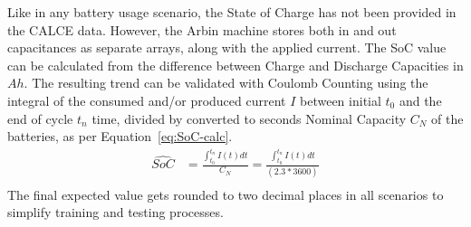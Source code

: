 %
Like in any battery usage scenario, the State of Charge has not been provided in the CALCE data.
However, the Arbin machine stores both in and out capacitances as separate arrays, along with the applied current.
The SoC value can be calculated from the difference between Charge and Discharge Capacities in $Ah$.
The resulting trend can be validated with Coulomb Counting using the integral of the consumed and/or produced current $I$ between initial $t_0$ and the end of cycle $t_n$ time, divided by converted to seconds Nominal Capacity $C_{N}$ of the batteries, as per \mbox{Equation~\ref{eq:SoC-calc}}.
\begin{equation}
    \begin{split}
        \hat{SoC} &= \frac{\int_{t_0}^{t_n} I(t)dt} {C_{N}} = \frac{\int_{t_0}^{t_n} I(t)dt} {(2.3*3600)} \\
        \label{eq:SoC-calc}
    \end{split}
\end{equation}
The final expected value gets rounded to two decimal places in all scenarios to simplify training and testing processes.

